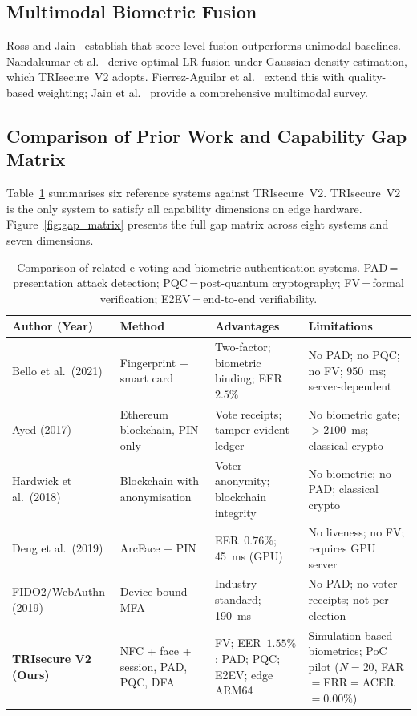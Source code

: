 \documentclass[pdflatex,sn-vancouver-num]{sn-jnl}%
\theoremstyle{thmstyleone}%
\theoremstyle{thmstyletwo}%
\theoremstyle{thmstylethree}%
\begin{document}
\subsection{Multimodal Biometric Fusion}

Ross and Jain~\cite{ross2003multimodal} establish that score-level fusion
outperforms unimodal baselines. Nandakumar et al.~\cite{nandakumar2008fusion}
derive optimal LR fusion under Gaussian density estimation, which TRIsecure~V2
adopts. Fierrez-Aguilar et al.~\cite{fierrez2005fusion} extend this with
quality-based weighting; Jain et al.~\cite{jain2011multimodal} provide a
comprehensive multimodal survey.

\subsection{Comparison of Prior Work and Capability Gap Matrix}

Table~\ref{tab:related_comparison} summarises six reference systems against
TRIsecure~V2. TRIsecure~V2 is the only system to satisfy all capability
dimensions on edge hardware. Figure~\ref{fig:gap_matrix} presents the full gap
matrix across eight systems and seven dimensions.

\begin{table}[t]
\caption{Comparison of related e-voting and biometric authentication systems.
  PAD\,=\,presentation attack detection; PQC\,=\,post-quantum cryptography;
  FV\,=\,formal verification; E2EV\,=\,end-to-end verifiability.}
\label{tab:related_comparison}
\small
\begin{tabularx}{\textwidth}{@{}p{2.9cm}p{3.5cm}XX@{}}
  \toprule
  \textbf{Author (Year)} & \textbf{Method} & \textbf{Advantages} & \textbf{Limitations} \\
  \midrule
  Bello et al.\ (2021)~\cite{bello2021biometric}
    & Fingerprint + smart card
    & Two-factor; biometric binding; EER~\(2.5\%\)
    & No PAD; no PQC; no FV; 950~ms; server-dependent \\[3pt]
  Ayed (2017)~\cite{ayed2017conceptual}
    & Ethereum blockchain, PIN-only
    & Vote receipts; tamper-evident ledger
    & No biometric gate; \(>2100\)~ms; classical crypto \\[3pt]
  Hardwick et al.\ (2018)~\cite{hardwick2018voting}
    & Blockchain with anonymisation
    & Voter anonymity; blockchain integrity
    & No biometric; no PAD; classical crypto \\[3pt]
  Deng et al.\ (2019)~\cite{deng2019arcface}
    & ArcFace + PIN
    & EER~\(0.76\%\); 45~ms (GPU)
    & No liveness; no FV; requires GPU server \\[3pt]
  FIDO2/WebAuthn (2019)~\cite{fido2_webauthn}
    & Device-bound MFA
    & Industry standard; 190~ms
    & No PAD; no voter receipts; not per-election \\
  \midrule
  \textbf{TRIsecure V2 (Ours)}
    & NFC + face + session, PAD, PQC, DFA
    & FV; EER~\(1.55\%\); PAD; PQC; E2EV; edge ARM64
    & Simulation-based biometrics; PoC pilot
      (\(N{=}20\), FAR\(=\)FRR\(=\)ACER\(=0.00\%\)) \\
  \bottomrule
\end{tabularx}
\end{table}
\end{document}
